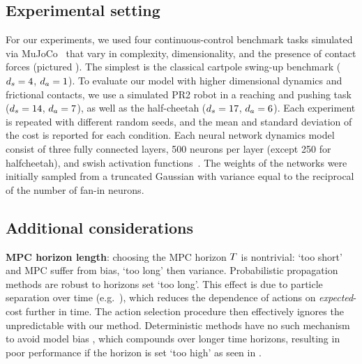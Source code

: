 \FloatBarrier
\subsection{Experimental setting}
\label{sec:results:setting}

	For our experiments, we used four continuous-control benchmark tasks simulated via MuJoCo~\citep{Todorov2012} that vary in complexity, dimensionality, and the presence of contact forces (pictured ).
	The simplest is the classical cartpole swing-up benchmark (${d_s}=4$, ${d_a}=1$).
    To evaluate our model with higher dimensional dynamics and frictional contacts, we use a simulated PR2 robot in a reaching and pushing task (${d_s}=14$, ${d_a}=7$),
	as well as the half-cheetah (${d_s}=17$, ${d_a}=6$).
	Each experiment is repeated with different random seeds, and the mean and standard deviation of the cost is reported for each condition.
	Each neural network dynamics model consist of three fully connected layers, 500 neurons per layer (except 250 for halfcheetah), and swish activation functions~\citep{Ramachandran2017}.
	The weights of the networks were initially sampled from a truncated Gaussian with variance equal to the reciprocal of the number of fan-in neurons.

	
\FloatBarrier
\subsection{Additional considerations}
\label{sec:results:additional}
\FloatBarrier
	\textbf{MPC horizon length}: 
	choosing the MPC horizon $T$ is nontrivial: `too short' and MPC suffer from bias, `too long' then variance. Probabilistic propagation methods are robust to horizons set `too long'. This effect is due to particle separation over time (e.g.\ ),
	which reduces the dependence of actions on \textit{expected}-cost further in time. The action selection procedure then effectively ignores the unpredictable with our method. Deterministic methods have no such mechanism to avoid model bias \citep{Deisenroth2014}, which compounds over longer time horizons, resulting in poor performance if the horizon is set `too high' as seen in .

